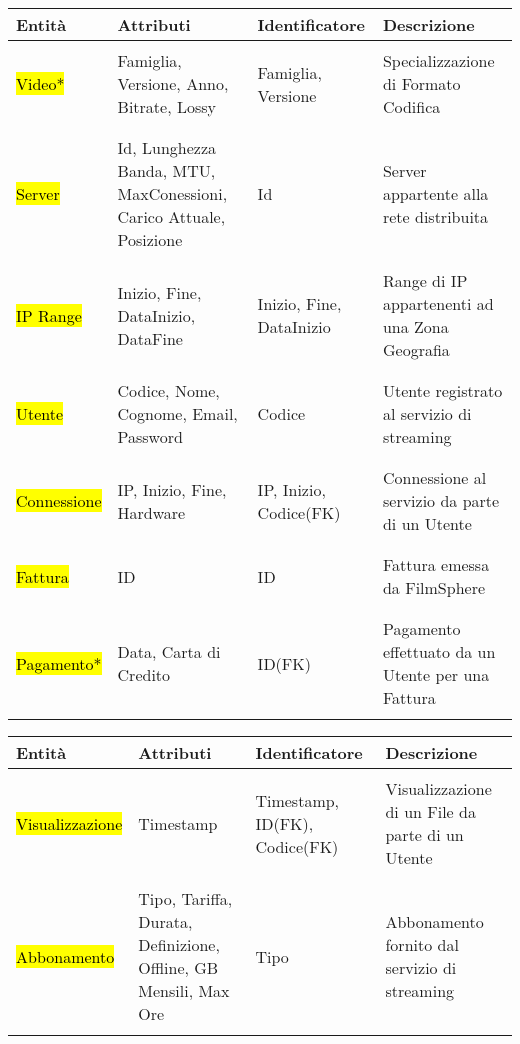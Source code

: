 \documentclass{article}
\begin{document}
%
%
\begin{tabular}{|C{1.9cm}|C{3.2cm}|C{2.3cm}|C{4cm}|}
\hline
 \textbf{Entità}& \textbf{Attributi}& \textbf{Identificatore}& \textbf{Descrizione}\\ 
\hline
\hline
& & & \\
 \hl{Video*} & Famiglia, Versione, Anno, Bitrate, Lossy & Famiglia, Versione & Specializzazione di Formato Codifica \\
& & & \\ 
\hline
& & & \\
 \hl{Server} & Id, Lunghezza Banda, MTU, MaxConessioni, Carico Attuale, Posizione & Id & Server appartente alla rete distribuita \\
& & & \\
\hline 
& & & \\
 \hl{IP Range} & Inizio, Fine, DataInizio, DataFine & Inizio, Fine, DataInizio & Range di IP appartenenti ad una Zona Geografia \\
& & & \\
\hline 
& & & \\
 \hl{Utente} & Codice, Nome, Cognome, Email, Password & Codice & Utente registrato al servizio di streaming \\ 
& & & \\
\hline 
& & & \\
 \hl{Connessione} & IP, Inizio, Fine, Hardware & IP, Inizio, Codice(FK) & Connessione al servizio da parte di un Utente\\ 
& & & \\ 
\hline
& & & \\
 \hl{Fattura} & ID & ID & Fattura emessa da FilmSphere \\ 
& & & \\
\hline
& & & \\
 \hl{Pagamento*} & Data, Carta di Credito & ID(FK) & Pagamento effettuato da un Utente per una Fattura \\
& & & \\
\hline
\end{tabular}
%
%
%
%
%
%
%
%
\begin{tabular}{|C{1.9cm}|C{3.2cm}|C{2.3cm}|C{4cm}|}
\hline
\textbf{Entità}& \textbf{Attributi}& \textbf{Identificatore}& \textbf{Descrizione}\\ 
\hline
\hline
& & & \\
 \hl{Visualizzazione} & Timestamp & Timestamp, ID(FK), Codice(FK) & Visualizzazione di un File da parte di un Utente \\ 
& & & \\
\hline 
& & & \\
 \hl{Abbonamento} & Tipo, Tariffa, Durata, Definizione, Offline, GB Mensili, Max Ore & Tipo & Abbonamento fornito dal servizio di streaming\\
& & & \\
\hline
\end{tabular}
\end{document}
